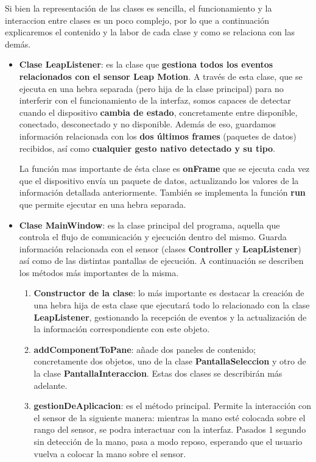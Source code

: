 Si bien la representación de las clases es sencilla, el funcionamiento y la interaccion entre clases es un poco complejo, por lo que a continuación explicaremos el contenido y la labor de cada clase y como se relaciona con las demás.

\begin{itemize}
	\item \textbf{Clase LeapListener}: es la clase que \textbf{gestiona todos los eventos relacionados con el sensor Leap Motion}. A través de esta clase, que se ejecuta en una hebra separada (pero hija de la clase principal) para no interferir con el funcionamiento de la interfaz, somos capaces de detectar cuando el dispositivo \textbf{cambia de estado}, concretamente entre disponible, conectado, desconectado y no disponible. Además de eso, guardamos información relacionada con los\textbf{ dos últimos frames} (paquetes de datos) recibidos, así como \textbf{cualquier gesto nativo detectado y su tipo}. 
	
	La función mas importante de ésta clase es \textbf{onFrame} que se ejecuta cada vez que el dispositivo envía un paquete de datos, actualizando los valores de la información detallada anteriormente. También se implementa la función \textbf{run} que permite ejecutar en una hebra separada.
	
	\item \textbf{Clase MainWindow}: es la clase principal del programa, aquella que controla el flujo de comunicación y ejecución dentro del mismo. Guarda información relacionada con el sensor (clases \textbf{Controller} y \textbf{LeapListener}) así como de las distintas pantallas de ejecución. A continuación se describen los métodos más importantes de la misma.
	
		\begin{enumerate}
			\item \textbf{Constructor de la clase}: lo más importante es destacar la creación de una hebra hija de esta clase que ejecutará todo lo relacionado con la clase \textbf{LeapListener}, gestionando la recepción de eventos y la actualización de la información correspondiente con este objeto.
			
			\item \textbf{addComponentToPane}: añade dos paneles de contenido; concretamente dos objetos, uno de la clase \textbf{PantallaSeleccion} y otro de la clase \textbf{PantallaInteraccion}. Estas dos clases se describirán más adelante.
			
			\item \textbf{gestionDeAplicacion}: es el método principal. Permite la interacción con el sensor de la siguiente manera: mientras la mano esté colocada sobre el rango del sensor, se podra interactuar con la interfaz. Pasados 1 segundo sin detección de la mano, pasa a modo reposo, esperando que el usuario vuelva a colocar la mano sobre el sensor. 
			

\end{enumerate}
\end{itemize}
